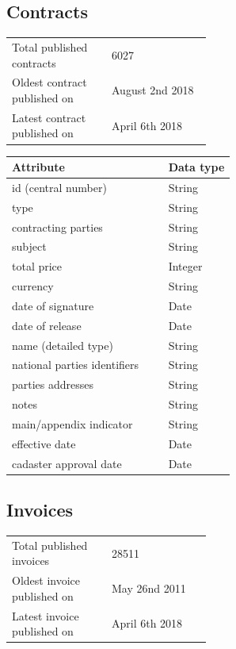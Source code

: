 \documentclass[thesis=B,english]{FITthesis}[2012/06/26]
\begin{document}
	\subsection{Contracts}
        \begin{tabular}{  p{0.5\linewidth}  l }
        \\
        Total published contracts & 6027 \\
        Oldest contract published on & August 2nd 2018\\
        Latest contract published on & April 6th 2018 \\
        \end{tabular}
        
    \begin{center}
        \begin{tabular}{  p{0.7\linewidth} | p{0.3\linewidth} }
        Attribute & Data type\\ \hline
        id (central number) & String \\
        type & String \\
        contracting parties & String \\
        subject & String \\
        total price & Integer \\
        currency & String \\
        date of signature & Date \\
        date of release & Date \\
        name (detailed type) & String \\
        national parties identifiers & String \\
        parties addresses & String \\
        notes & String \\
        main/appendix indicator & String \\
        effective date & Date \\
        cadaster approval date & Date \\
        \end{tabular}
    \end{center}
	\subsection{Invoices}
	\begin{tabular}{  p{0.5\linewidth}  l }
        \\
        Total published invoices & 28511 \\
        Oldest invoice published on & May 26nd 2011\\
        Latest invoice published on & April 6th 2018 \\
        \end{tabular}
        
\end{document}
